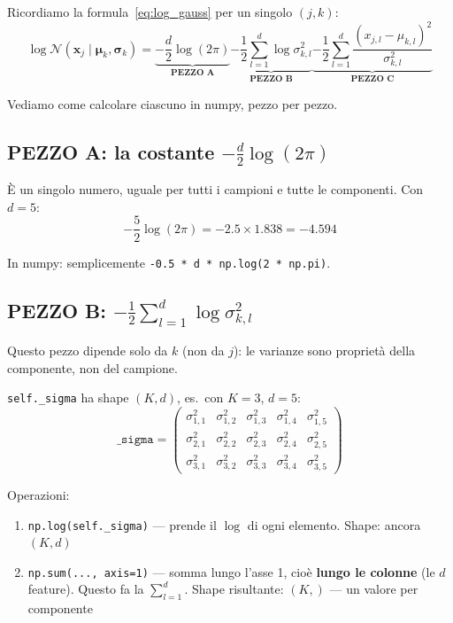 \documentclass[11pt,a4paper]{article}
\begin{document}
Ricordiamo la formula~\eqref{eq:log_gauss} per un singolo $(j, k)$:
$$\log \mathcal{N}(\mathbf{x}_j\mid\boldsymbol{\mu}_k, \boldsymbol{\sigma}_k) = \underbrace{-\frac{d}{2}\log(2\pi)}_{\textbf{PEZZO A}} \underbrace{- \frac{1}{2}\sum_{l=1}^{d}\log\sigma_{k,l}^2}_{\textbf{PEZZO B}} \underbrace{- \frac{1}{2}\sum_{l=1}^{d}\frac{(x_{j,l} - \mu_{k,l})^2}{\sigma_{k,l}^2}}_{\textbf{PEZZO C}}$$

Vediamo come calcolare ciascuno in numpy, pezzo per pezzo.

\subsection{PEZZO A: la costante $-\frac{d}{2}\log(2\pi)$}

\`E un singolo numero, uguale per tutti i campioni e tutte le componenti. Con $d = 5$:
$$-\frac{5}{2}\log(2\pi) = -2.5 \times 1.838 = -4.594$$

In numpy: semplicemente \texttt{-0.5 * d * np.log(2 * np.pi)}.

\subsection{PEZZO B: $-\frac{1}{2}\sum_{l=1}^{d}\log\sigma_{k,l}^2$}

Questo pezzo dipende solo da $k$ (non da $j$): le varianze sono propriet\`a della componente, non del campione.

\texttt{self.\_sigma} ha shape $(K, d)$, es.\ con $K=3$, $d=5$:
$$\texttt{\_sigma} = \begin{pmatrix} \sigma_{1,1}^2 & \sigma_{1,2}^2 & \sigma_{1,3}^2 & \sigma_{1,4}^2 & \sigma_{1,5}^2 \\ \sigma_{2,1}^2 & \sigma_{2,2}^2 & \sigma_{2,3}^2 & \sigma_{2,4}^2 & \sigma_{2,5}^2 \\ \sigma_{3,1}^2 & \sigma_{3,2}^2 & \sigma_{3,3}^2 & \sigma_{3,4}^2 & \sigma_{3,5}^2 \end{pmatrix}$$

Operazioni:
\begin{enumerate}
    \item \texttt{np.log(self.\_sigma)} --- prende il $\log$ di ogni elemento. Shape: ancora $(K, d)$
    \item \texttt{np.sum(..., axis=1)} --- somma lungo l'asse 1, cio\`e \textbf{lungo le colonne} (le $d$ feature). Questo fa la $\sum_{l=1}^d$. Shape risultante: $(K,)$ --- un valore per componente
\end{enumerate}
\end{document}
